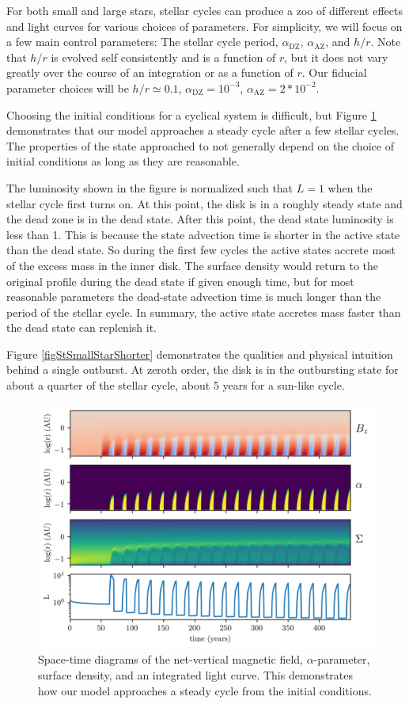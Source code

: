 For both small and large stars, stellar cycles can produce a zoo of different effects and light curves for various choices of parameters. For simplicity, we will focus on a few main control parameters: The stellar cycle period, $\alpha_{\text{DZ}}$, $\alpha_{\text{AZ}}$, and $h/r$.  Note that $h/r$ is evolved self consistently and is a function of $r$, but it does not vary greatly over the course of an integration or as a function of $r$.  Our fiducial parameter choices will be $h/r \simeq 0.1$, $\alpha_{\text{DZ}}=10^{-3}$, $\alpha_{\text{AZ}}=2*10^{-2}$.

Choosing the initial conditions for a cyclical system is difficult, but Figure \ref{figStSmallStarLong} demonstrates that our model approaches a steady cycle after a few stellar cycles.  The properties of the state approached to not generally depend on the choice of initial conditions as long as they are reasonable.  

The luminosity shown in the figure is normalized such that $L=1$ when the stellar cycle first turns on.  At this point, the disk is in a roughly steady state and the dead zone is in the dead state.  After this point, the dead state luminosity is less than 1.  This is because the state advection time is shorter in the active state than the dead state.  So during the first few cycles the active states accrete most of the excess mass in the inner disk.  The surface density would return to the original profile during the dead state if given enough time, but for most reasonable parameters the dead-state advection time is much longer than the period of the stellar cycle.  In summary, the active state accretes mass faster than the dead state can replenish it.

Figure \ref{figStSmallStarShorter} demonstrates the qualities and physical intuition behind a single outburst.  At zeroth order, the disk is in the outbursting state for about a quarter of the stellar cycle, about 5 years for a sun-like cycle.   


\begin{figure}[p]
\centering
\includegraphics[width=0.7\columnwidth]{figs/figsChapter3/run10242/MST1_.png}
\caption{Space-time diagrams of the net-vertical magnetic field, $\alpha$-parameter, surface density, and an integrated light curve.  This demonstrates how our model approaches a steady cycle from the initial conditions.}
\label{figStSmallStarLong}
\end{figure}

